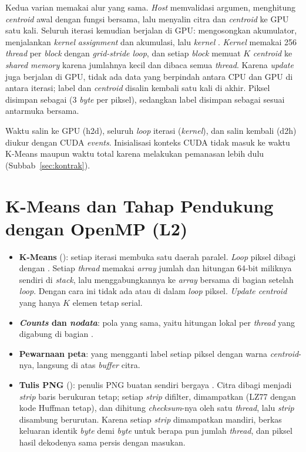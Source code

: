 Kedua varian memakai alur yang sama. \emph{Host} memvalidasi argumen, menghitung \emph{centroid} awal dengan fungsi bersama, lalu menyalin citra dan \emph{centroid} ke GPU satu kali. Seluruh iterasi kemudian berjalan di GPU: mengosongkan akumulator, menjalankan \emph{kernel} \emph{assignment} dan akumulasi, lalu \emph{kernel} . \emph{Kernel} memakai 256 \emph{thread} per \emph{block} dengan \emph{grid-stride loop}, dan setiap \emph{block} memuat $K$ \emph{centroid} ke \emph{shared memory} karena jumlahnya kecil dan dibaca semua \emph{thread}. Karena \emph{update} juga berjalan di GPU, tidak ada data yang berpindah antara CPU dan GPU di antara iterasi; label dan \emph{centroid} disalin kembali satu kali di akhir. Piksel disimpan sebagai  (3 \emph{byte} per piksel), sedangkan label disimpan sebagai  sesuai antarmuka bersama.

Waktu salin ke GPU (h2d), seluruh \emph{loop} iterasi (\emph{kernel}), dan salin kembali (d2h) diukur dengan CUDA \emph{events}. Inisialisasi konteks CUDA tidak masuk ke waktu K-Means maupun waktu total karena  melakukan pemanasan lebih dulu (Subbab~\ref{sec:kontrak}).

\section{K-Means dan Tahap Pendukung dengan OpenMP (L2)}
\label{sec:omp}
\begin{itemize}
    \item \textbf{K-Means} (): setiap iterasi membuka satu daerah paralel. \emph{Loop} piksel dibagi dengan . Setiap \emph{thread} memakai \emph{array} jumlah dan hitungan 64-bit miliknya sendiri di \emph{stack}, lalu menggabungkannya ke \emph{array} bersama di bagian  setelah \emph{loop}. Dengan cara ini tidak ada  atau  di dalam \emph{loop} piksel. \emph{Update centroid} yang hanya $K$ elemen tetap serial.
    \item \textbf{\emph{Counts} dan \emph{nodata}}: pola yang sama, yaitu hitungan lokal per \emph{thread} yang digabung di bagian .
    \item \textbf{Pewarnaan peta}:  yang mengganti label setiap piksel dengan warna \emph{centroid}-nya, langsung di atas \emph{buffer} citra.
    \item \textbf{Tulis PNG} (): penulis PNG buatan sendiri bergaya . Citra dibagi menjadi \emph{strip} baris berukuran tetap; setiap \emph{strip} difilter, dimampatkan (LZ77 dengan kode Huffman tetap), dan dihitung \emph{checksum}-nya oleh satu \emph{thread}, lalu \emph{strip} disambung berurutan. Karena setiap \emph{strip} dimampatkan mandiri, berkas keluaran identik \emph{byte} demi \emph{byte} untuk berapa pun jumlah \emph{thread}, dan piksel hasil dekodenya sama persis dengan masukan.
\end{itemize}

